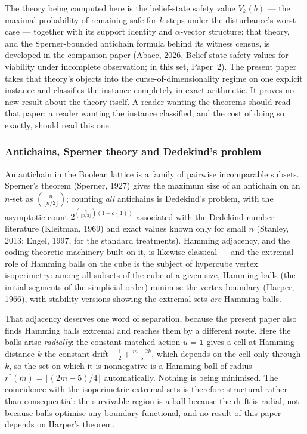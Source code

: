 \documentclass[10pt,twocolumn]{article}
\theoremstyle{plain}
\theoremstyle{definition}
\theoremstyle{remark}
\begin{document}
The theory being computed here is the belief-state safety value \(V_k(b)\) --- the maximal
probability of remaining safe for \(k\) steps under the disturbance's worst case --- together
with its support identity and \(\alpha\)-vector structure; that theory, and the
Sperner-bounded antichain formula behind its witness census, is developed in the companion
paper (Abaee, 2026, Belief-state safety values for viability under incomplete observation;
in this set, Paper~2). The present paper takes that theory's objects into the
curse-of-dimensionality regime on one explicit instance and classifies the instance
completely in exact arithmetic. It proves no new result about the theory itself. A reader
wanting the theorems should read that paper; a reader wanting the instance classified, and
the cost of doing so exactly, should read this one.

\subsubsection{Antichains, Sperner theory and Dedekind's problem}

An antichain in the Boolean lattice is a family of pairwise incomparable subsets. Sperner's
theorem (Sperner, 1927) gives the maximum size of an antichain on an \(n\)-set as
\(\binom{n}{\lfloor n/2\rfloor}\); counting \emph{all} antichains is Dedekind's problem,
with the asymptotic count \(2^{\binom{n}{\lfloor n/2\rfloor}(1+o(1))}\) associated with the Dedekind-number literature
(Kleitman, 1969) and exact values known only for small \(n\) (Stanley, 2013; Engel, 1997, for the
standard treatments). Hamming adjacency, and the coding-theoretic machinery built on it, is
likewise classical --- and the extremal role of Hamming balls on the cube is the subject of
hypercube vertex isoperimetry: among all subsets of the cube of a given size, Hamming balls
(the initial segments of the simplicial order) minimise the vertex boundary (Harper, 1966),
with stability versions showing the extremal sets \emph{are} Hamming balls.

That adjacency deserves one word of separation, because the present paper also finds Hamming
balls extremal and reaches them by a different route. Here the balls arise \emph{radially}: the
constant matched action \(u = \mathbf{1}\) gives a cell at Hamming distance \(k\) the constant
drift \(-\tfrac12 + \tfrac{m-2k}{5}\), which depends on the cell only through \(k\), so the set
on which it is nonnegative is a Hamming ball of radius \(r^{*}(m) = \lfloor (2m-5)/4\rfloor\)
automatically. Nothing is being minimised. The coincidence with the isoperimetric extremal sets
is therefore structural rather than consequential: the survivable region is a ball because the
drift is radial, not because balls optimise any boundary functional, and no result of this
paper depends on Harper's theorem.
\end{document}
